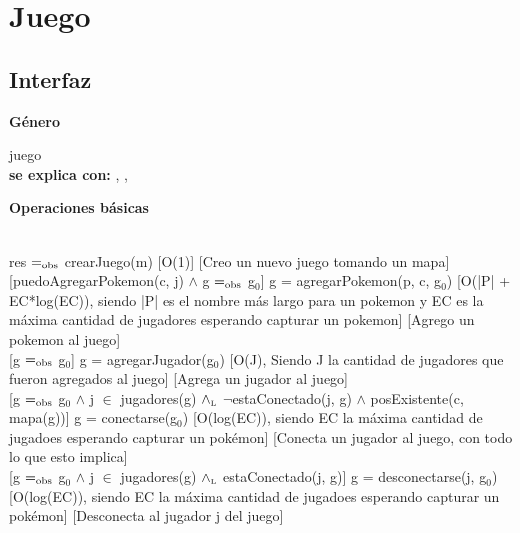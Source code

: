 \section{Juego}

\subsection{Interfaz}

\parbox {1,7cm}{{\bf Género}} juego \\
{\bf se explica con:}  ,  , \\
\medskip

\parbox {1,5cm}{\bf{Operaciones básicas}}\\

{res $=_{\mathrm{obs}}$ crearJuego(m)}
[O(1)]
[Creo un nuevo juego tomando un mapa]\\

[puedoAgregarPokemon(c, j) $\wedge$ g $=_{\mathrm{obs}}$ g$_0$]
{g = agregarPokemon(p, c, g$_0$)}
[O(|P| + EC*log(EC)), siendo |P| es el nombre más largo para un pokemon y EC es la máxima cantidad de jugadores esperando capturar un pokemon]
[Agrego un pokemon al juego]\\

[g $=_{\mathrm{obs}}$ g$_0$]
{g = agregarJugador(g$_0$)}
[O(J), Siendo J la cantidad de jugadores que fueron agregados al juego]
[Agrega un jugador al juego]\\

[g $=_{\mathrm{obs}}$ g$_0$ $\wedge$ j $\in$ jugadores(g) $\land_{\mathrm{\scriptscriptstyle{L}}}$ $\neg$estaConectado(j, g) $\wedge$ posExistente(c, mapa(g))]
{g = conectarse(g$_0$)}
[O(log(EC)), siendo EC la máxima cantidad de jugadoes esperando capturar un pokémon]
[Conecta un jugador al juego, con todo lo que esto implica]\\

[g $=_{\mathrm{obs}}$ g$_0$ $\wedge$ j $\in$ jugadores(g) $\land_{\mathrm{\scriptscriptstyle{L}}}$ estaConectado(j, g)]
{g = desconectarse(j, g$_0$)}
[O(log(EC)), siendo EC la máxima cantidad de jugadoes esperando capturar un pokémon]
[Desconecta al jugador j del juego]\\

